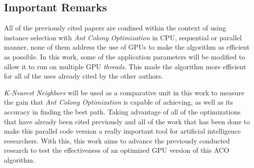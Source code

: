 \subsection{Important Remarks}

All of the previously cited papers are confined within the context of using instance selection with \emph{Ant Colony Optimization} in CPU, sequential or parallel manner, none of them address the use of GPUs to
make the algorithm as efficient as possible. In this work, some of the application parameters will be modified to allow it to run on multiple GPU \emph{threads}. This made the algorithm more efficient for all of the uses already cited by the other authors.

\emph{K-Nearest Neighbors} will be used as a comparative unit in this work to measure the gain that \emph{Ant Colony Optimization} is capable of achieving, as well as its accuracy in finding the best path. Taking advantage of all of the optimizations that have already been cited previously and all of the work that has been done to make this parallel code version a really important tool for artificial intelligence researchers. With this, this work aims to advance the previously conducted research to test the effectiveness of an optimized GPU version of this ACO algorithm.
